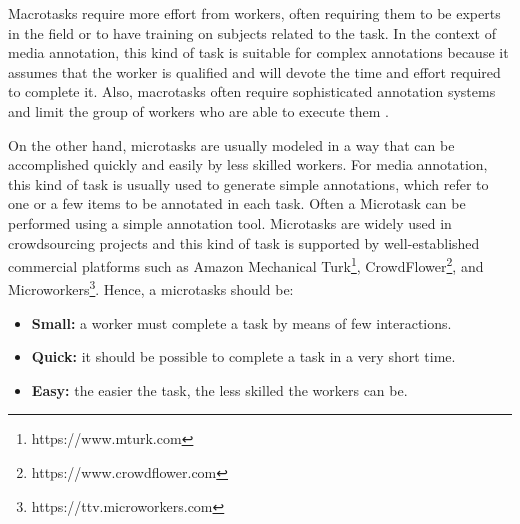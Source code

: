 Macrotasks require more effort from workers, often requiring them to be experts in the field or to have training on subjects related to the task. In the context of media annotation, this kind of task is suitable for complex annotations because it assumes that the worker is qualified and will devote the time and effort required to complete it. Also, macrotasks often require sophisticated annotation systems and limit the group of workers who are able to execute them \citep{Haas:2015:AMC:2824032.2824062}.


On the other hand, microtasks are usually modeled in a way that can be accomplished quickly and easily by less skilled workers. For media annotation, this kind of task is usually used to generate simple annotations, which refer to one or a few items to be annotated in each task. Often a Microtask can be performed using a simple annotation tool. Microtasks are widely used in crowdsourcing projects and this kind of task is supported by well-established commercial platforms such as Amazon Mechanical Turk\footnote{https://www.mturk.com}, CrowdFlower\footnote{https://www.crowdflower.com}, and Microworkers\footnote{https://ttv.microworkers.com}. Hence, a microtasks should be:
\begin{itemize}
	\item{\textbf{Small:}} a worker must complete a task by means of few interactions.
	
	\item{\textbf{Quick:}} it should be possible to complete a task in a very short time.

	\item{\textbf{Easy:}} the easier the task, the less skilled the workers can be. 
	
\end{itemize}



